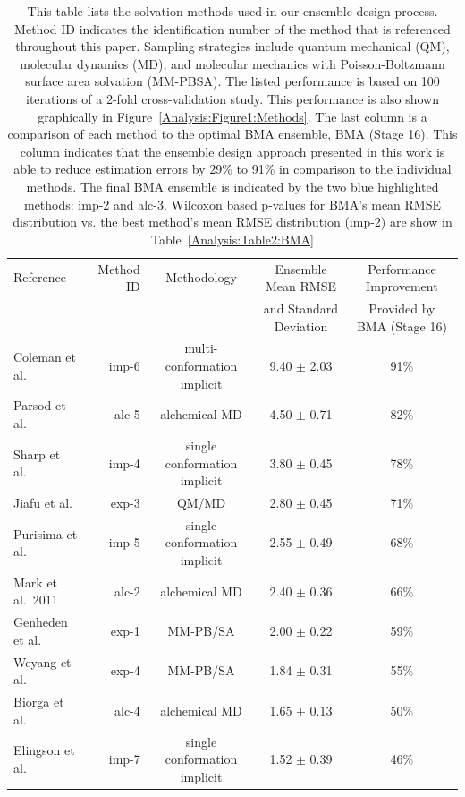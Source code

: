 \documentclass[12pt]{article}
\newcommand{\+}[1]{\ensuremath{\mathbf{#1}}}
\begin{document}
\begin{table}[t]
	\centering
	\caption[Ensemble Constituents]{This table lists the solvation methods used in our ensemble design process. Method ID indicates the identification number of the method that is referenced throughout this paper. Sampling strategies include quantum mechanical (QM), molecular dynamics (MD), and molecular mechanics with Poisson-Boltzmann surface area solvation (MM-PBSA). The listed performance is based on 100 iterations of a 2-fold cross-validation study.  This performance is also shown graphically in Figure~\ref{Analysis:Figure1:Methods}. The last column is a comparison of each method to the optimal BMA ensemble, BMA (Stage 16). This column indicates that the ensemble design approach presented in this work is able to reduce estimation errors by 29\% to 91\% in comparison to the individual methods. The final BMA ensemble is indicated by the two blue highlighted methods: imp-2 and alc-3. Wilcoxon based p-values for BMA's mean RMSE distribution vs. the best method's mean RMSE distribution (imp-2) are show in Table~\ref{Analysis:Table2:BMA}}
	\scriptsize
	\begin{tabular}{l|r|c|c|c}
		\hline
		\hline
		Reference & Method ID & Methodology & Ensemble Mean RMSE & Performance Improvement \\
		& & & and Standard Deviation & Provided by BMA (Stage 16)\\
		\hline
		Coleman et al.~\cite{Coleman:2014} & imp-6  & multi-conformation implicit & 9.40 $\pm$ 2.03 & 91\% \\
		Parsod et al. & alc-5 &  alchemical MD & 4.50 $\pm$ 0.71 & 82\% \\ 
		Sharp et al.~\cite{Yang:2006} & imp-4 & single conformation implicit & 3.80 $\pm$ 0.45 & 78\% \\
		Jiafu et al. & exp-3 & QM/MD & 2.80 $\pm$ 0.45 & 71\% \\
		Purisima et al.~\cite{Hogues:2014} & imp-5  & single conformation implicit & 2.55 $\pm$ 0.49 & 68\%\\
		Mark et al.~2011 & alc-2 & alchemical MD & 2.40 $\pm$ 0.36 & 66\%\\ 
		Genheden et al.~\cite{Genheden:2014} & exp-1  & MM-PB/SA & 2.00 $\pm$ 0.22 & 59\%\\
		Weyang et al. & exp-4  & MM-PB/SA & 1.84 $\pm$ 0.31 & 55\%\\		
		Biorga et al.~\cite{Beckstein:2012,Beckstein:2014} & alc-4  & alchemical MD & 1.65 $\pm$ 0.13 & 50\%\\ 
		Elingson et al.~\cite{Ellingson:2014} & imp-7  & single conformation implicit & 1.52 $\pm$ 0.39 & 46\%\\

\end{tabular}
\end{table}
\end{document}
